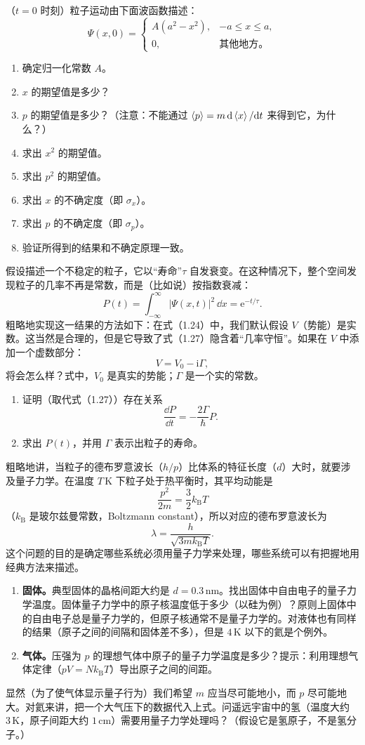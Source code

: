 （$t=0$ 时刻）粒子运动由下面波函数描述：
\[
\Psi(x,0)=\begin{cases}
A(a^2-x^2),&-a\leq x\leq a,\\
0,&\text{其他地方。}
\end{cases}
\]
\begin{enumerate}
\item 确定归一化常数 $A$。
\item $x$ 的期望值是多少？
\item $p$ 的期望值是多少？（注意：不能通过 $\left\langle p\right\rangle=m\,\mathrm{d}\left\langle x\right\rangle/\mathrm{d} t$ 来得到它，为什么？）
\item 求出 $x^2$ 的期望值。
\item 求出 $p^2$ 的期望值。
\item 求出 $x$ 的不确定度（即 $\sigma_x$）。
\item 求出 $p$ 的不确定度（即 $\sigma_p$）。
\item 验证所得到的结果和不确定原理一致。
\end{enumerate}
\vfill

假设描述一个不稳定的粒子，它以“寿命”$\tau$ 自发衰变。在这种情况下，整个空间发现粒子的几率不再是常数，而是（比如说）按指数衰减：
\[
P(t)=\int_{-\infty}^{\infty}|\Psi(x,t)|^2\,\dd x=\mathrm{e}^{-t/\tau}.
\]
粗略地实现这一结果的方法如下：在式（1.24）中，我们默认假设 $V$（势能）是实数。这当然是合理的，但是它导致了式（1.27）隐含着“几率守恒”。如果在 $V$ 中添加一个虚数部分：
\[
V=V_0-\mathrm{i}\Gamma,
\]
将会怎么样？式中，$V_0$ 是真实的势能；$\Gamma$ 是一个实的常数。
\begin{enumerate}
\item 证明（取代式（1.27））存在关系
\[
\frac{\dd P}{\dd t}=-\frac{2\Gamma}{\hbar}P.
\]
\item 求出 $P(t)$，并用 $\Gamma$ 表示出粒子的寿命。
\end{enumerate}
\vfill

粗略地讲，当粒子的德布罗意波长（$h/p$）比体系的特征长度（$d$）大时，就要涉及量子力学。在温度 $T\,\mathrm{K}$ 下粒子处于热平衡时，其平均动能是
\[
\frac{p^2}{2m}=\frac{3}{2}k_{\mathrm B}T
\]
（$k_{\mathrm B}$ 是玻尔兹曼常数，Boltzmann constant），所以对应的德布罗意波长为
\[
\lambda=\frac{h}{\sqrt{3mk_{\mathrm B}T}}.
\]
这个问题的目的是确定哪些系统必须用量子力学来处理，哪些系统可以有把握地用经典方法来描述。
\begin{enumerate}
\item \textbf{固体。}典型固体的晶格间距大约是 $d=0.3\,\mathrm{nm}$。找出固体中自由电子的量子力学温度。固体量子力学中的原子核温度低于多少（以硅为例）？原则上固体中的自由电子总是量子力学的，但原子核通常不是量子力学的。对液体也有同样的结果（原子之间的间隔和固体差不多），但是 $4\,\mathrm{K}$ 以下的氦是个例外。
\item \textbf{气体。}压强为 $p$ 的理想气体中原子的量子力学温度是多少？提示：利用理想气体定律（$pV=Nk_{\mathrm B}T$）导出原子之间的间距。
\end{enumerate}
显然（为了使气体显示量子行为）我们希望 $m$ 应当尽可能地小，而 $p$ 尽可能地大。对氦来讲，把一个大气压下的数据代入上式。问遥远宇宙中的氢（温度大约 $3\,\mathrm{K}$，原子间距大约 $1\,\mathrm{cm}$）需要用量子力学处理吗？（假设它是氢原子，不是氢分子。）
\vfill
